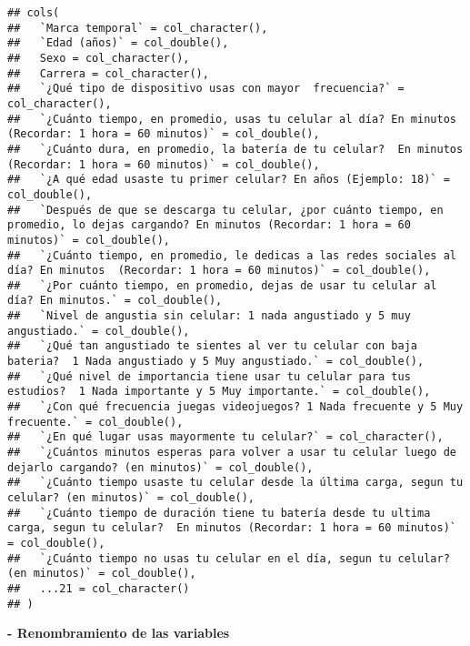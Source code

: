 \documentclass[
]{article}
\begin{document}
\begin{verbatim}
## cols(
##   `Marca temporal` = col_character(),
##   `Edad (años)` = col_double(),
##   Sexo = col_character(),
##   Carrera = col_character(),
##   `¿Qué tipo de dispositivo usas con mayor  frecuencia?` = col_character(),
##   `¿Cuánto tiempo, en promedio, usas tu celular al día? En minutos (Recordar: 1 hora = 60 minutos)` = col_double(),
##   `¿Cuánto dura, en promedio, la batería de tu celular?  En minutos (Recordar: 1 hora = 60 minutos)` = col_double(),
##   `¿A qué edad usaste tu primer celular? En años (Ejemplo: 18)` = col_double(),
##   `Después de que se descarga tu celular, ¿por cuánto tiempo, en promedio, lo dejas cargando? En minutos (Recordar: 1 hora = 60 minutos)` = col_double(),
##   `¿Cuánto tiempo, en promedio, le dedicas a las redes sociales al día? En minutos  (Recordar: 1 hora = 60 minutos)` = col_double(),
##   `¿Por cuánto tiempo, en promedio, dejas de usar tu celular al día? En minutos.` = col_double(),
##   `Nivel de angustia sin celular: 1 nada angustiado y 5 muy angustiado.` = col_double(),
##   `¿Qué tan angustiado te sientes al ver tu celular con baja bateria?  1 Nada angustiado y 5 Muy angustiado.` = col_double(),
##   `¿Qué nivel de importancia tiene usar tu celular para tus estudios?  1 Nada importante y 5 Muy importante.` = col_double(),
##   `¿Con qué frecuencia juegas videojuegos? 1 Nada frecuente y 5 Muy frecuente.` = col_double(),
##   `¿En qué lugar usas mayormente tu celular?` = col_character(),
##   `¿Cuántos minutos esperas para volver a usar tu celular luego de dejarlo cargando? (en minutos)` = col_double(),
##   `¿Cuánto tiempo usaste tu celular desde la última carga, segun tu celular? (en minutos)` = col_double(),
##   `¿Cuánto tiempo de duración tiene tu batería desde tu ultima carga, segun tu celular?  En minutos (Recordar: 1 hora = 60 minutos)` = col_double(),
##   `¿Cuánto tiempo no usas tu celular en el día, segun tu celular? (en minutos)` = col_double(),
##   ...21 = col_character()
## )
\end{verbatim}

\textbf{- Renombramiento de las variables}
\end{document}
